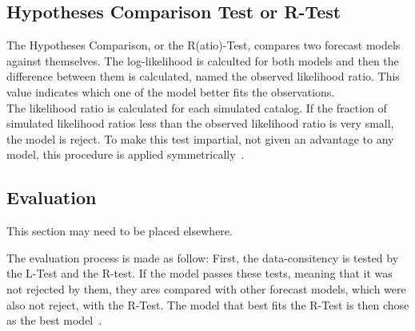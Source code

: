 \subsection{Hypotheses Comparison Test or R-Test}

The Hypotheses Comparison, or the R(atio)-Test, compares two forecast
models against themselves. The log-likelihood is calculted for both
models and then the difference between them is calculated, named the
observed likelihood ratio. This value indicates which one of the model
better fits the observations.\\

The likelihood ratio is calculated for each simulated catalog. If the
fraction of simulated likelihood ratios less than the observed
likelihood ratio is very small, the model is reject.  To make this
test impartial, not given an advantage to any model, this procedure is
applied symmetrically~\cite{schorlemmer2010first}.\\


\subsection{Evaluation}\label{eval}
This section may need to be placed elsewhere.

The evaluation process is made as follow: First, the data-consitency
is tested by the L-Test and the R-test. If the model passes these
tests, meaning that it was not rejected by them, they ares compared
with other forecast models, which were also not reject, with the
R-Test. The model that best fits the R-Test is then chose as the best
model~\cite{schorlemmer2007earthquake}.\\

